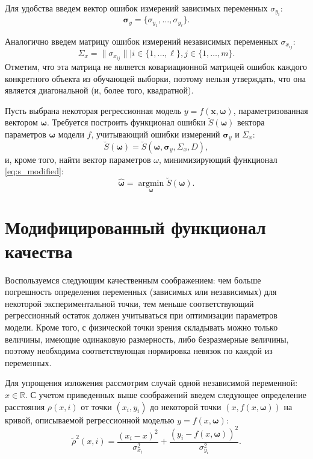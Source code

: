 \documentclass[tikz,10pt,a4paper]{article}
\newcommand{\bomega}{\boldsymbol{\omega}}
\begin{document}
Для удобства введем вектор ошибок измерений зависимых переменных $\sigma_{y_i}$:
\[
  \boldsymbol{\sigma}_y = \{ \sigma_{y_1}, \dots, \sigma_{y_{\ell}} \}.
\]

Аналогично введем матрицу ошибок измерений независимых переменных $\sigma_{x_{ij}}$:
\[
  \Sigma_x = \| \sigma_{x_{ij}} \| | i \in \{ 1, \dots, \ell \}, j \in \{ 1, \dots, m \}.
\]
Отметим, что эта матрица не является
ковариационной матрицей ошибок
каждого конкретного объекта из обучающей выборки,
поэтому нельзя утверждать, что она является
диагональной (и, более того, квадратной).

Пусть выбрана некоторая регрессионная модель
$y = f (\mathbf{x}, \bomega)$, параметризованная вектором $\bomega$.
Требуется построить функционал ошибки $\breve{S}(\bomega)$ вектора параметров
$\bomega$ модели $f$, учитывающий ошибки измерений $\boldsymbol{\sigma}_y$ и
$\Sigma_x$:
\begin{equation}
  \breve{S}(\bomega) = \breve{S}(\bomega, \boldsymbol{\sigma}_y, \Sigma_x, D),
  \label{eq:s_modified}
\end{equation}
и, кроме того, найти вектор параметров $\omega$, минимизирующий функционал
\eqref{eq:s_modified}:
\begin{equation}
  \hat{\bomega} = \mathop{\arg \min}\limits_{\bomega} \breve{S}(\bomega).
\end{equation}

\section{Модифицированный функционал качества}

Воспользуемся следующим качественным соображением:
чем больше погрешность определения переменных (зависимых или независимых)
для некоторой экспериментальной точки, тем меньше соответствующий
регрессионный остаток должен учитываться при оптимизации параметров модели.
Кроме того, с физической точки зрения складывать
можно только величины, имеющие одинаковую размерность, либо безразмерные
величины, поэтому необходима соответствующая нормировка невязок по каждой
из переменных.

Для упрощения изложения рассмотрим случай одной независимой переменной:
$x \in \mathbb{R}$. С учетом приведенных выше соображений введем
следующее определение расстояния $\rho(x, i)$
от точки $(x_i, y_i)$ до некоторой точки
$(x, f(x, \bomega))$ на кривой, описываемой регрессионной моделью $y = f(x, \bomega)$:
\begin{equation}
  \tilde{\rho}^2(x, i) = \frac{(x_i - x)^2}{\sigma_{x_i}^2} + \frac{(y_i - f(x, \bomega))^2}{\sigma_{y_i}^2}.
  \label{eq:dist0}
\end{equation}
\end{document}
